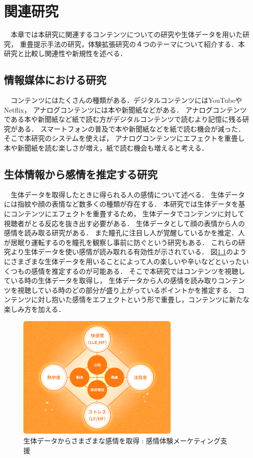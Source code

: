 \thispagestyle{myheadings}
\chapter{関連研究}
　本章では本研究に関連するコンテンツについての研究や生体データを用いた研究，
重畳提示手法の研究，体験拡張研究の４つのテーマについて紹介する．本研究と比較し関連性や新規性を述べる．



\section{情報媒体における研究}
　コンテンツにはたくさんの種類がある．デジタルコンテンツにはYouTubeやNetflix，
アナログコンテンツには本や新聞紙などがある．
アナログコンテンツである本や新聞紙など紙で読む方がデジタルコンテンツで読むより記憶に残る研究がある\cite{books}．
スマートフォンの普及で本や新聞紙などを紙で読む機会が減った．そこで本研究のシステムを使えば，
アナログコンテンツにエフェクトを重畳し本や新聞紙を読む楽しさが増え，紙で読む機会も増えると考える．

\section{生体情報から感情を推定する研究}

　生体データを取得したときに得られる人の感情について述べる．
生体データには指紋や顔の表情など数多くの種類が存在する．
本研究では生体データを基にコンテンツにエフェクトを重畳するため，
生体データでコンテンツに対して視聴者がとる反応を抜き出す必要がある．
生体データとして顔の表情から人の感情を読み取る研究がある\cite{hyoujou,hyoujou2}．
また瞳孔に注目し人が覚醒しているかを推定．人が居眠り運転するのを瞳孔を観察し事前に防ぐという研究もある\cite{doukou}．
これらの研究より生体データを使い感情が読み取れる有効性が示されている．
図\ref{seitaidata}のようにさまざまな生体データを用いることによって人の楽しいや辛いなどといったいくつもの感情を推定するのが可能ある．
そこで本研究ではコンテンツを視聴している時の生体データを取得し，
生体データから人の感情を読み取りコンテンツを視聴している時のどの部分が盛り上がっているポイントかを推定する．
コンテンツに対し抱いた感情をエフェクトという形で重畳し，コンテンツに新たな楽しみ方を加える．

\begin{figure}[H]
    \centering
    \includegraphics[width=8cm]{images/chapter2/heart.png}
    \caption{生体データからさまざまな感情を取得 : 感情体験メーケティング支援}
    \label{seitaidata}
\end{figure}


